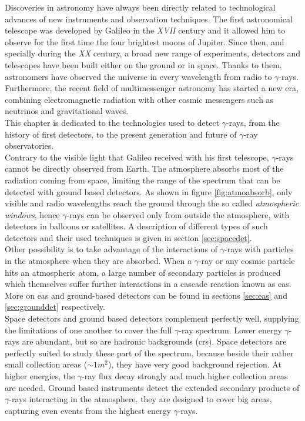 \documentclass[main.tex]{subfiles}
\begin{document}
\glsresetall
Discoveries in astronomy have always been directly related to technological advances of new instruments and observation techniques. The first astronomical telescope was developed by Galileo in the \textit{XVII} century and it allowed him to observe for the first time the four brightest moons of Jupiter. Since then, and specially during the \textit{XX} century, a broad new range of experiments, detectors and telescopes have been built either on the ground or in space. Thanks to them, astronomers have observed the universe in every wavelength from radio to $\gamma$-rays. Furthermore, the recent field of multimessenger astronomy has started a new era, combining electromagnetic radiation with other cosmic messengers such as neutrinos and gravitational waves.\\
This chapter is dedicated to the technologies used to detect $\gamma$-rays, from the history of first detectors, to the present generation and future of $\gamma$-ray observatories.\\

Contrary to the visible light that Galileo received with his first telescope, $\gamma$-rays cannot be directly observed from Earth. The atmosphere absorbs most of the radiation coming from space, limiting the range of the spectrum that can be detected with ground based detectors. As shown in figure \ref{fig:atmoabsorb}, only visible and radio wavelengths reach the ground through the so called \textit{atmospheric windows}, hence $\gamma$-rays can be observed only from outside the atmosphere, with detectors in balloons or satellites. A description of different types of such detectors and their used techniques is given in section \ref{sec:spacedet}.\\

Other possibility is to take advantage of the interactions of $\gamma$-rays with particles in the atmosphere when they are absorbed. When a $\gamma$-ray or any cosmic particle hits an atmospheric atom, a large number of secondary particles is produced which themselves suffer further interactions in a cascade reaction known as \gls{eas}.
More on \gls{eas} and ground-based detectors can be found in sections \ref{sec:eas} and \ref{sec:grounddet} respectively.\\

Space detectors and ground based detectors complement perfectly well, supplying the limitations of one another to cover the full $\gamma$-ray spectrum. Lower energy $\gamma$-rays are abundant, but so are hadronic backgrounds (\glspl{cr}). Space detectors are perfectly suited to study these part of the spectrum, because beside their rather small collection areas ($\sim 1 m^2$), they have very good background rejection. At higher energies, the $\gamma$-ray flux decay strongly and much higher collection areas are needed. Ground based instruments detect the extended secondary products of $\gamma$-rays interacting in the atmosphere, they are designed to cover big areas, capturing even events from the highest energy $\gamma$-rays.\\
\end{document}

